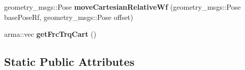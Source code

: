 \begin{DoxyCompactItemize}
\item 
\hypertarget{classkukadu_1_1KukieControlQueue_ad0964c0cbfc3a44b7544396d5b9d0cba}{geometry\-\_\-msgs\-::\-Pose {\bfseries move\-Cartesian\-Relative\-Wf} (geometry\-\_\-msgs\-::\-Pose base\-Pose\-Rf, geometry\-\_\-msgs\-::\-Pose offset)}\label{classkukadu_1_1KukieControlQueue_ad0964c0cbfc3a44b7544396d5b9d0cba}

\item 
\hypertarget{classkukadu_1_1KukieControlQueue_ab6563d18842c941f87ae942c983e47bd}{arma\-::vec {\bfseries get\-Frc\-Trq\-Cart} ()}\label{classkukadu_1_1KukieControlQueue_ab6563d18842c941f87ae942c983e47bd}

\end{DoxyCompactItemize}
\subsection*{Static Public Attributes}
